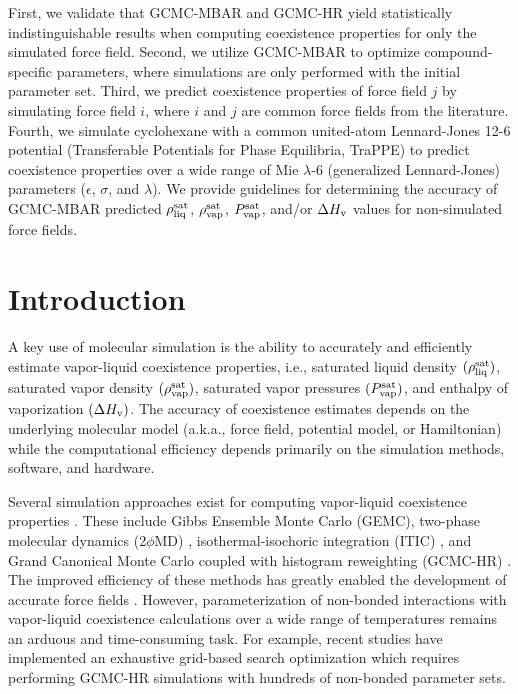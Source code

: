 \documentclass[journal=jced,manuscript=article]{achemso}
\begin{document}
First, we validate that GCMC-MBAR and GCMC-HR yield 
statistically
indistinguishable results when computing coexistence properties for only the simulated force field. Second, we utilize GCMC-MBAR to optimize compound-specific parameters, where simulations are only performed with the initial 
parameter set. Third, we predict coexistence properties of force field $j$ by simulating force field $i$, where $i$ and $j$ are common force fields from the literature. Fourth, we simulate cyclohexane with a common united-atom Lennard-Jones 12-6 potential (Transferable Potentials for Phase Equilibria, TraPPE) to predict coexistence properties over a wide range of Mie $\lambda$-6 (generalized Lennard-Jones) parameters ($\epsilon$, $\sigma$, and $\lambda$). We provide guidelines for determining the accuracy of GCMC-MBAR predicted $\rho_{\rm liq}^{\rm sat}$, $\rho_{\rm vap}^{\rm sat}$, $P_{\rm vap}^{\rm sat}$, and/or $\Delta H_{\rm v}$ values for non-simulated force fields. 


\section{Introduction}

A key use of molecular simulation is the ability to accurately and efficiently estimate vapor-liquid coexistence properties, i.e., saturated liquid density $(\rho_{\rm liq}^{\rm sat})$, saturated vapor density $(\rho_{\rm vap}^{\rm sat})$, saturated vapor pressures $(P_{\rm vap}^{\rm sat})$, and enthalpy of vaporization $(\Delta H_{\rm v})$. The accuracy of coexistence estimates depends on the underlying molecular model (a.k.a., force field, potential model, or Hamiltonian) while the computational efficiency depends primarily on the simulation methods, software, and hardware.

Several simulation approaches exist for computing vapor-liquid coexistence properties \cite{Pana2000}. These include Gibbs Ensemble Monte Carlo (GEMC), two-phase molecular dynamics (2$\phi$MD) \cite{Fern2007}, isothermal-isochoric integration (ITIC) \cite{Mostafa2018}, and Grand Canonical Monte Carlo coupled with histogram reweighting (GCMC-HR) \cite{Pana2000,Potoff1999,Stubbs2004}. The improved efficiency of these methods has greatly enabled the development of accurate force fields \cite{TraPPE,TAMie,Mie,AUA4,Mess4}. However, parameterization of non-bonded interactions with vapor-liquid coexistence calculations over a wide range of temperatures remains an arduous and time-consuming task. For example, recent studies have implemented an exhaustive grid-based search optimization which requires performing GCMC-HR simulations with hundreds of non-bonded parameter sets. \cite{Mick_Mie,Potoff_branched,Barhaghi2017}
\end{document}
